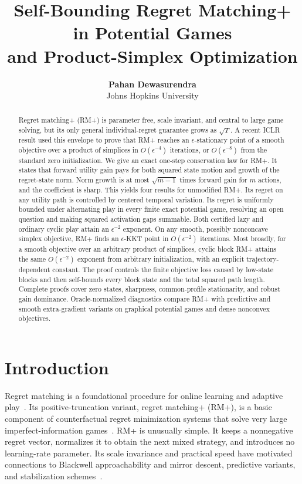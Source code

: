 \documentclass{article}
\title{Self-Bounding Regret Matching+ in Potential Games\\and Product-Simplex Optimization}
\author{\textbf{Pahan Dewasurendra} \\ Johns Hopkins University}
\begin{document}
\maketitle

\begin{abstract}
Regret matching+ (RM+) is parameter free, scale invariant, and central to large game solving, but its only general individual-regret guarantee grows as $\sqrt{T}$. A recent ICLR result used this envelope to prove that RM+ reaches an $\epsilon$-stationary point of a smooth objective over a product of simplices in $O(\epsilon^{-4})$ iterations, or $O(\epsilon^{-8})$ from the standard zero initialization. We give an exact one-step conservation law for RM+. It states that forward utility gain pays for both squared state motion and growth of the regret-state norm. Norm growth is at most $\sqrt{m-1}$ times forward gain for $m$ actions, and the coefficient is sharp. This yields four results for unmodified RM+. Its regret on any utility path is controlled by centered temporal variation. Its regret is uniformly bounded under alternating play in every finite exact potential game, resolving an open question and making squared activation gaps summable. Both certified lazy and ordinary cyclic play attain an $\epsilon^{-2}$ exponent. On any smooth, possibly nonconcave simplex objective, RM+ finds an $\epsilon$-KKT point in $O(\epsilon^{-2})$ iterations. Most broadly, for a smooth objective over an arbitrary product of simplices, cyclic block RM+ attains the same $O(\epsilon^{-2})$ exponent from arbitrary initialization, with an explicit trajectory-dependent constant. The proof controls the finite objective loss caused by low-state blocks and then self-bounds every block state and the total squared path length. Complete proofs cover zero states, sharpness, common-profile stationarity, and robust gain dominance. Oracle-normalized diagnostics compare RM+ with predictive and smooth extra-gradient variants on graphical potential games and dense nonconvex objectives.
\end{abstract}

\section{Introduction}

Regret matching is a foundational procedure for online learning and adaptive play~\citep{Hart00:Simple}. Its positive-truncation variant, regret matching+ (RM+), is a basic component of counterfactual regret minimization systems that solve very large imperfect-information games~\citep{Tammelin14:Solving,Zinkevich07:Regret}. RM+ is unusually simple. It keeps a nonnegative regret vector, normalizes it to obtain the next mixed strategy, and introduces no learning-rate parameter. Its scale invariance and practical speed have motivated connections to Blackwell approachability and mirror descent, predictive variants, and stabilization schemes~\citep{Farina21:Faster,Farina23:Regret,Cai25:Last,Zhang25:Scale,Meng26:Faster}.
\end{document}
